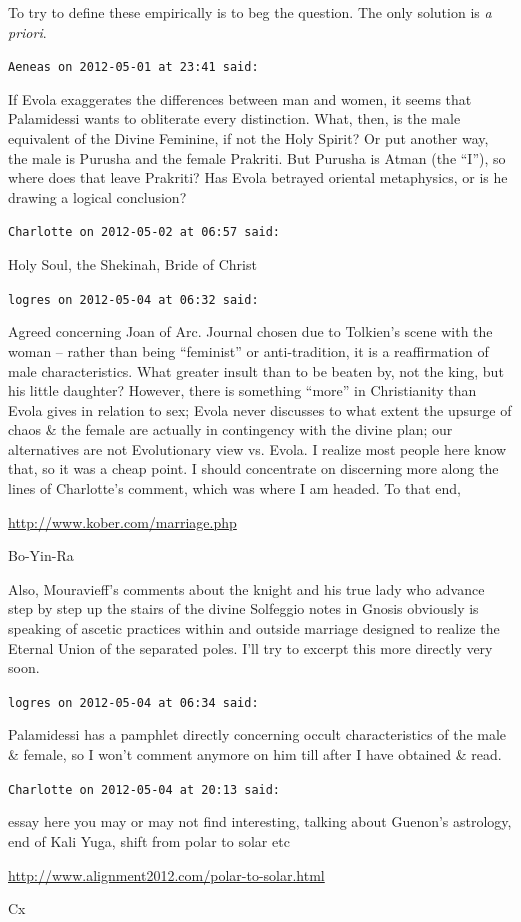 \begin{footnotesize}
\begin{sffamily}
To try to define these empirically is to beg the question. The only solution is \emph{a priori}.

\hfill

\texttt{Aeneas on 2012-05-01 at 23:41 said:}

If Evola exaggerates the differences between man and women, it seems that Palamidessi wants to obliterate every distinction. What, then, is the male equivalent of the Divine Feminine, if not the Holy Spirit? Or put another way, the male is Purusha and the female Prakriti. But Purusha is Atman (the ``I''), so where does that leave Prakriti? Has Evola betrayed oriental metaphysics, or is he drawing a logical conclusion?

\hfill

\texttt{Charlotte on 2012-05-02 at 06:57 said:}

Holy Soul, the Shekinah, Bride of Christ

\hfill

\texttt{logres on 2012-05-04 at 06:32 said:}

Agreed concerning Joan of Arc. Journal chosen due to Tolkien's scene with the woman -- rather than being ``feminist'' or anti-tradition, it is a reaffirmation of male characteristics. What greater insult than to be beaten by, not the king, but his little daughter? However, there is something ``more'' in Christianity than Evola gives in relation to sex; Evola never discusses to what extent the upsurge of chaos \& the female are actually in contingency with the divine plan; our alternatives are not Evolutionary view vs. Evola. I realize most people here know that, so it was a cheap point. I should concentrate on discerning more along the lines of Charlotte's comment, which was where I am headed. To that end,

\url{http://www.kober.com/marriage.php}

Bo-Yin-Ra

Also, Mouravieff's comments about the knight and his true lady who advance step by step up the stairs of the divine Solfeggio notes in Gnosis obviously is speaking of ascetic practices within and outside marriage designed to realize the Eternal Union of the separated poles. I'll try to excerpt this more directly very soon.

\hfill

\texttt{logres on 2012-05-04 at 06:34 said:}

Palamidessi has a pamphlet directly concerning occult characteristics of the male \& female, so I won't comment anymore on him till after I have obtained \& read.

\hfill

\texttt{Charlotte on 2012-05-04 at 20:13 said:}

essay here you may or may not find interesting, talking about Guenon's astrology, end of Kali Yuga, shift from polar to solar etc

\url{http://www.alignment2012.com/polar-to-solar.html}

Cx

\hfill

\end{sffamily}
\end{footnotesize}

